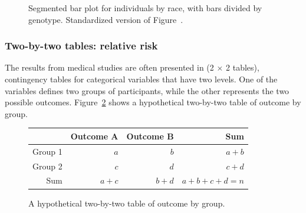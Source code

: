 \begin{figure}[h]
	\centering
	\caption{ Segmented bar plot for individuals by race, with bars divided by genotype.  Standardized version of Figure~.}
	\label{famussSegBarPlotB}
\end{figure}


\textD{\newpage}


\subsubsection{Two-by-two tables: relative risk}
\label{TwoWayTablesRelativeRisk}

The results from medical studies are often presented in  (2 $\times$ 2 tables), contingency tables for categorical variables that have two levels. One of the variables defines two groups of participants, while the other represents the two possible outcomes. Figure~\ref{TwoByTwoTable} shows a hypothetical two-by-two table of outcome by group.

\begin{figure}[h]
	\centering
	\begin{tabular}{r|rrr}
		\hline
		& Outcome A & Outcome B & Sum\\ 
		\hline
		Group 1 & $a$ & $b$ & $a + b$ \\ 
		Group 2 & $c$ & $d$ & $c + d$ \\
		Sum & $a + c$ & $b + d$ & $a + b + c + d = n$ \\
		\hline
	\end{tabular}	
	\caption{A hypothetical two-by-two table of outcome by group.}
	\label{TwoByTwoTable} 
\end{figure}

